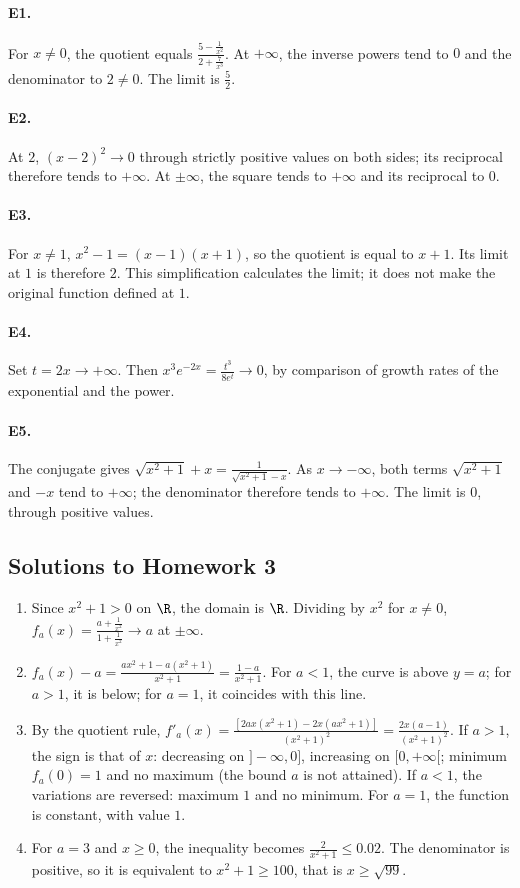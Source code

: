 \paragraph{E1.}For $x\ne0$, the quotient equals $\frac{5-\frac{1}{x^2}}{2+\frac{7}{x^3}}$. At $+\infty$, the inverse powers tend to $0$ and the denominator to $2\ne0$. The limit is $\frac{5}{2}$.

\paragraph{E2.}At $2$, $(x-2)^2\to0$ through strictly positive values on both sides; its reciprocal therefore tends to $+\infty$. At $\pm\infty$, the square tends to $+\infty$ and its reciprocal to $0$.

\paragraph{E3.}For $x\ne1$, $x^2-1=(x-1)(x+1)$, so the quotient is equal to $x+1$. Its limit at $1$ is therefore $2$. This simplification calculates the limit; it does not make the original function defined at $1$.

\paragraph{E4.}Set $t=2x\to+\infty$. Then $x^3e^{-2x}=\frac{t^3}{8e^t}\to0$, by comparison of growth rates of the exponential and the power.

\paragraph{E5.}The conjugate gives $\sqrt{x^2+1}+x=\frac{1}{\sqrt{x^2+1}-x}$. As $x\to-\infty$, both terms $\sqrt{x^2+1}$ and $-x$ tend to $+\infty$; the denominator therefore tends to $+\infty$. The limit is $0$, through positive values.

\subsection{Solutions to Homework 3}\begin{enumerate}
\item Since $x^2+1>0$ on $\R$, the domain is $\R$. Dividing by $x^2$ for $x\ne0$, $f_a(x)=\frac{a+\frac{1}{x^2}}{1+\frac{1}{x^2}}\to a$ at $\pm\infty$.
\item $f_a(x)-a=\frac{ax^2+1-a(x^2+1)}{x^2+1}=\frac{1-a}{x^2+1}$. For $a<1$, the curve is above $y=a$; for $a>1$, it is below; for $a=1$, it coincides with this line.
\item By the quotient rule, $f'_a(x)=\frac{[2ax(x^2+1)-2x(ax^2+1)]}{(x^2+1)^2}=\frac{2x(a-1)}{(x^2+1)^2}$.
If $a>1$, the sign is that of $x$: decreasing on $]-\infty,0]$, increasing on $[0,+\infty[$; minimum $f_a(0)=1$ and no maximum (the bound $a$ is not attained). If $a<1$, the variations are reversed: maximum $1$ and no minimum. For $a=1$, the function is constant, with value $1$.
\item For $a=3$ and $x\ge0$, the inequality becomes $\frac{2}{x^2+1}\le0.02$. The denominator is positive, so it is equivalent to $x^2+1\ge100$, that is $x\ge\sqrt{99}$.
\end{enumerate}

